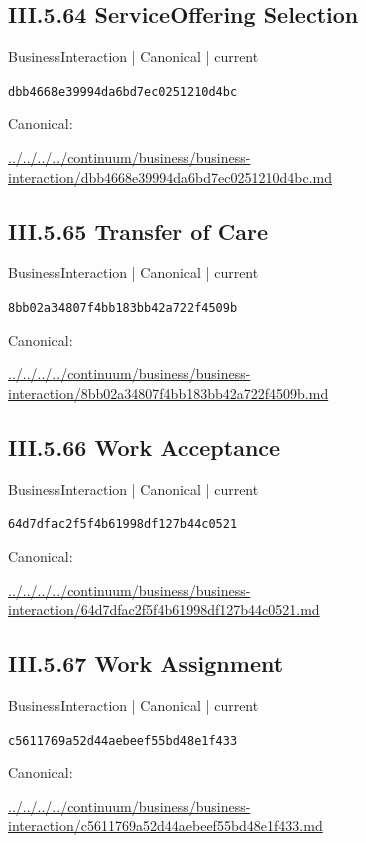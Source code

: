 \documentclass[10pt,a4paper]{article}
\begin{document}
\subsection*{III.5.64 ServiceOffering Selection}
\label{element-dbb4668e39994da6bd7ec0251210d4bc}
{\small BusinessInteraction | Canonical | current}\par
\texttt{dbb4668e39994da6bd7ec0251210d4bc}\par
Canonical: \par
{\footnotesize\url{../../../../continuum/business/business-interaction/dbb4668e39994da6bd7ec0251210d4bc.md}}\par
\subsection*{III.5.65 Transfer of Care}
\label{element-8bb02a34807f4bb183bb42a722f4509b}
{\small BusinessInteraction | Canonical | current}\par
\texttt{8bb02a34807f4bb183bb42a722f4509b}\par
Canonical: \par
{\footnotesize\url{../../../../continuum/business/business-interaction/8bb02a34807f4bb183bb42a722f4509b.md}}\par
\subsection*{III.5.66 Work Acceptance}
\label{element-64d7dfac2f5f4b61998df127b44c0521}
{\small BusinessInteraction | Canonical | current}\par
\texttt{64d7dfac2f5f4b61998df127b44c0521}\par
Canonical: \par
{\footnotesize\url{../../../../continuum/business/business-interaction/64d7dfac2f5f4b61998df127b44c0521.md}}\par
\subsection*{III.5.67 Work Assignment}
\label{element-c5611769a52d44aebeef55bd48e1f433}
{\small BusinessInteraction | Canonical | current}\par
\texttt{c5611769a52d44aebeef55bd48e1f433}\par
Canonical: \par
{\footnotesize\url{../../../../continuum/business/business-interaction/c5611769a52d44aebeef55bd48e1f433.md}}\par
\end{document}

